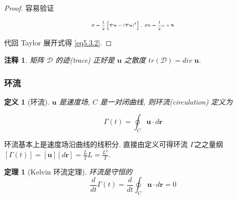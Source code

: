 \documentclass[aspectratio=2516]{beamer}
\newtheorem{rmk}{\kaishu 注释}
\newtheorem{defi}{\kaishu 定义}
\newtheorem{thm}{\kaishu 定理}
\begin{document}
\begin{frame}
\begin{proof}
	\vspace{-0.15cm}
	
	容易验证
	
	\vspace{-0.15cm}
	
	\begin{equation}
	\tiny
	\mathcal{S}= \frac{1}{2}\left[ {\nabla \boldsymbol{u}- {{\left( {\nabla \boldsymbol{u}} \right)}^t}} \right],\;\mathcal{S}h = \frac{1}{2}\omega  \times \boldsymbol{h}
	\label{eq5.3.4}
	\end{equation}
	
	\vspace{-0.15cm}
	
	代回 Taylor 展开式得 \ref{eq5.3.2}.
	
\end{proof}

\begin{rmk}
	\kaishu 
	\tiny
	矩阵 $ \mathcal{D} $ 的迹(trace) 正好是 $ \boldsymbol{u} $  之散度 $tr\left( \mathcal{D} \right) = div\;\boldsymbol{u}$.
\end{rmk}

\end{frame}


\begin{frame}
\frametitle{ \kaishu 环流}

\vspace{-0.75cm}

\kaishu

\begin{defi}[\kaishu 环流]
	
	\kaishu 
	
	$ \boldsymbol{u} $ 是速度场, $ C $ 是一对闭曲线, 则环流(circulation) 定义为
	
	\begin{equation}
	\Gamma \left( t \right) = \oint_C {\boldsymbol{u} \cdot d\boldsymbol{r}} 
	\label{eq5.3.5}
	\end{equation}
	\label{def5.3.2}
\end{defi}

环流基本上是速度场沿曲线的线积分. 直接由定义可得环流 $ \Gamma $之之量纲 $\left[ {\Gamma \left( t \right)} \right] = \left[ \boldsymbol{u} \right]\left[ {d\boldsymbol{r}} \right] = \frac{L}{T}L = \frac{{{L^2}}}{T}$. 

\begin{thm}[\kaishu Kelvin 环流定理]
	
	\kaishu
	
	环流是守恒的
	\begin{equation}
	\frac{d}{{dt}}\Gamma \left( t \right) = \frac{d}{{dt}}\oint_C {\boldsymbol{u} \cdot d\boldsymbol{r}}  = 0
	\label{eq5.3.6}
	\end{equation}
\end{thm}

\end{frame}
\end{document}
